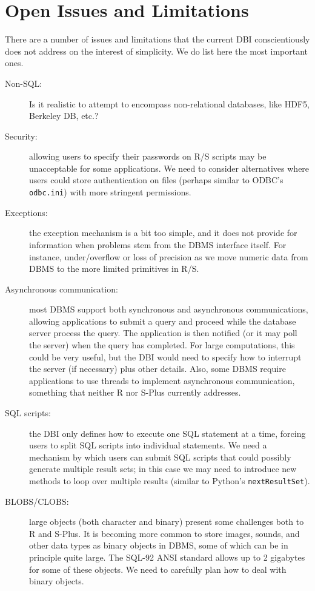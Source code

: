 \documentclass[graphics,times,psfig,dvips,hyper]{article}
\begin{document}
\section{Open Issues and Limitations}\label{sec:open-issues}
There are a number of issues and limitations that the current
DBI conscientiously does not address on the interest of simplicity.
We do list here the most important ones.
\begin{description}
\item[Non-SQL:]
  Is it realistic to attempt to encompass non-relational databases,
  like HDF5, Berkeley DB, etc.?

\item[Security:] 
  allowing users to specify their passwords on R/S scripts may
  be unacceptable for some applications.  We need to consider
  alternatives where users could store authentication on files
  (perhaps similar to ODBC's \texttt{odbc.ini}) with more stringent 
  permissions.

\item[Exceptions:]
  the exception mechanism is a bit too simple, and it does not
  provide for information when problems stem from the DBMS
  interface itself.  For instance, under/overflow or loss of
  precision as we move numeric data from DBMS to the more limited
  primitives in R/S.

\item[Asynchronous communication:]
  most DBMS support both synchronous and asynchronous communications,
  allowing applications to submit a query and proceed while
  the database server process the query. The application is then
  notified (or it may poll the server) when the query has completed.
  For large computations, this could be very useful, but the DBI
  would need to specify how to interrupt the server (if necessary)
  plus other details.  Also, some DBMS require applications to use
  threads to implement asynchronous communication, something that
  neither R nor S-Plus currently addresses.

\item[SQL scripts:]
  the DBI only defines how to execute one SQL statement at a time, 
  forcing users to split SQL scripts into individual statements.
  We need a mechanism by which users can submit SQL scripts that
  could possibly generate multiple result sets;  in this case we 
  may need to introduce new methods to loop over multiple results
  (similar to Python's \texttt{nextResultSet}).

\item[BLOBS/CLOBS:]
  large objects (both character and binary) present some challenges both
  to R and S-Plus.  It is becoming more common to store images, sounds,
  and other data types as binary objects in DBMS, some of which can
  be in principle quite large. The SQL-92 ANSI standard allows up
  to 2 gigabytes for some of these objects.  We need to carefully
  plan how to deal with binary objects.
  

\end{description}
\end{document}
